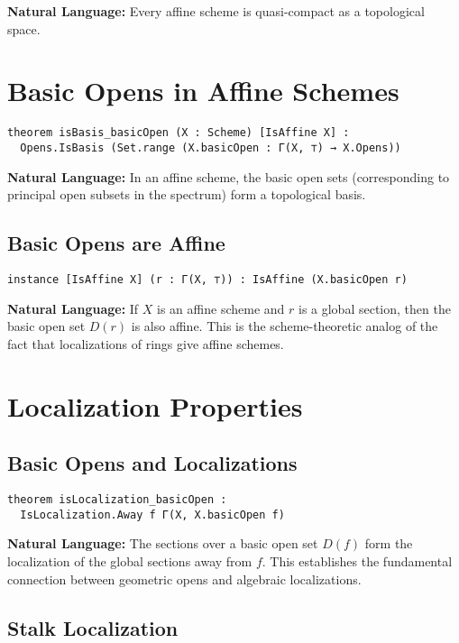 \documentclass{article}
\theoremstyle{definition}
\begin{document}
\textbf{Natural Language:} Every affine scheme is quasi-compact as a topological space.

\section{Basic Opens in Affine Schemes}

\begin{lstlisting}
theorem isBasis_basicOpen (X : Scheme) [IsAffine X] :
  Opens.IsBasis (Set.range (X.basicOpen : Γ(X, ⊤) → X.Opens))
\end{lstlisting}

\textbf{Natural Language:} In an affine scheme, the basic open sets (corresponding to principal open subsets in the spectrum) form a topological basis.

\subsection{Basic Opens are Affine}

\begin{lstlisting}
instance [IsAffine X] (r : Γ(X, ⊤)) : IsAffine (X.basicOpen r)
\end{lstlisting}

\textbf{Natural Language:} If $X$ is an affine scheme and $r$ is a global section, then the basic open set $D(r)$ is also affine. This is the scheme-theoretic analog of the fact that localizations of rings give affine schemes.

\section{Localization Properties}

\subsection{Basic Opens and Localizations}

\begin{lstlisting}
theorem isLocalization_basicOpen :
  IsLocalization.Away f Γ(X, X.basicOpen f)
\end{lstlisting}

\textbf{Natural Language:} The sections over a basic open set $D(f)$ form the localization of the global sections away from $f$. This establishes the fundamental connection between geometric opens and algebraic localizations.

\subsection{Stalk Localization}
\end{document}
